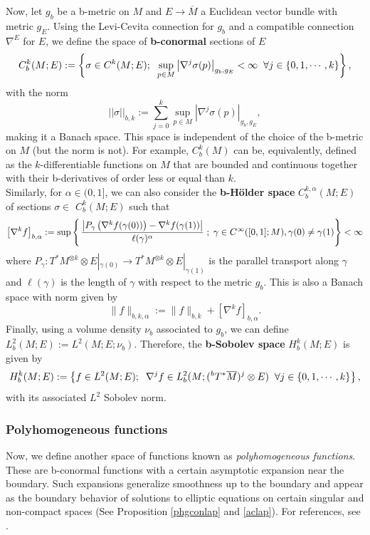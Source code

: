 \documentclass[a4paper,11pt]{article}
\begin{document}
Now, let $g_b$ be a b-metric on $M$ and $E \rightarrow \overline{M}$ a Euclidean vector bundle with metric $g_E$. Using the Levi-Cevita connection for $g_b$ and a compatible connection $\nabla^E$ for $E$, we define the space of \textbf{b-conormal} sections of $E$ 
$$
C_b^k(M ; E) := \left\{ \sigma \in C^k(M ; E) ; \hspace{0.2cm} \sup_{p \in M} \left| \nabla^{j} \sigma(p) \right|_{g_b, g_E} < \infty \hspace{0.2cm} \forall j \in \{0,1, \cdots, k \} \right\},
$$
with the norm 
$$
|| \sigma ||_{b,k} := \sum_{j=0}^k \sup_{p \in M} \left| \nabla^{j} \sigma(p) \right|_{g_b, g_E},
$$
making it a Banach space. This space is independent of the choice of the b-metric on $M$ (but the norm is not). For example, $C_b^k(M )$ can be, equivalently, defined as the $k$-differentiable functions on $M$ that are bounded and continuous together with their b-derivatives of order less or equal than $k$.\\

Similarly, for $\alpha \in(0,1]$, we can also consider the \textbf{b-Hölder space} $C_b^{k, \alpha}(M ; E)$ of sections $\sigma \in$ $C_b^k(M; E)$ such that
$$
\left[\nabla^k f\right]_{b, \alpha}:=\sup \left\{\left.\frac{\left|P_\gamma\left(\nabla^k f(\gamma(0))\right)-\nabla^k f(\gamma(1))\right|}{\ell(\gamma)^\alpha} \right.; \hspace{0.1cm} \gamma \in C^{\infty}([0,1] ; M ), \gamma(0) \neq \gamma(1) \right\}<\infty
$$
where $P_\gamma: T^{*}M^{\otimes k} \otimes E |_{\gamma(0)} \rightarrow T^{*}M^{\otimes k} \otimes E|_{\gamma(1)}$ is the parallel transport along $\gamma$ and $\ell(\gamma)$ is the length of $\gamma$ with respect to the metric $g_b$. This is also a Banach space with norm given by
$$
\|f\|_{b, k, \alpha}:=\|f\|_{b, k}+\left[\nabla^k f\right]_{b, \alpha}.
$$
Finally, using a volume density $\nu_b$ associated to $g_b$, we can define $L_b^2(M ; E) := L^2 (M; E; \nu_b)$. Therefore, the \textbf{b-Sobolev space} $H_b^k(M; E)$ is given by
$$
H_b^k(M; E) := \left\{ f \in L^2(M;E) ; \hspace{0.2cm} \nabla^{j}f \in L_b^2(M ; (\hspace{0.01cm} ^{b}T^{*} \overline{M})^j \otimes E ) \hspace{0.2cm} \forall j \in \{0,1, \cdots, k \} \right\},
$$
with its associated $L^2$ Sobolev norm.
\subsubsection{Polyhomogeneous functions} \label{phgfnc}
Now, we define another space of functions known as \textit{polyhomogeneous functions}. These are b-conormal functions with a certain asymptotic expansion near the boundary. Such expansions generalize smoothness up to the boundary and appear as the boundary behavior of solutions to elliptic equations on certain singular and non-compact spaces (See Proposition \ref{phgconlap} and \ref{aclap}).  For references, see \cite{melrose_atiyah-patodi-singer_1993, melrose_calculus_1992, melrose_pseudodifferential_1990, grieser_singular_2001, grieser2017scalesblowupquasimodeconstructions}. \\
\end{document}
